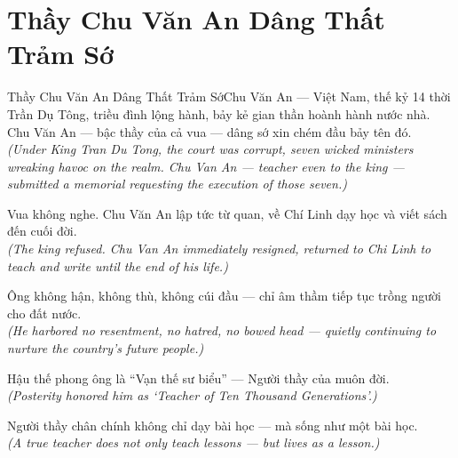 \section{Thầy Chu Văn An Dâng Thất Trảm Sớ}
\begin{truyen}{Thầy Chu Văn An Dâng Thất Trảm Sớ}{Chu Văn An --- Việt Nam, thế kỷ 14}
 thời Trần Dụ Tông, triều đình lộng hành, bảy kẻ gian thần hoành hành nước nhà. Chu Văn An --- bậc thầy của cả vua --- dâng sớ xin chém đầu bảy tên đó.\\[4pt]
\textit{(Under King Tran Du Tong, the court was corrupt, seven wicked ministers wreaking havoc on the realm. Chu Van An --- teacher even to the king --- submitted a memorial requesting the execution of those seven.)}

Vua không nghe. Chu Văn An lập tức từ quan, về Chí Linh dạy học và viết sách đến cuối đời.\\[4pt]
\textit{(The king refused. Chu Van An immediately resigned, returned to Chi Linh to teach and write until the end of his life.)}

Ông không hận, không thù, không cúi đầu --- chỉ âm thầm tiếp tục trồng người cho đất nước.\\[4pt]
\textit{(He harbored no resentment, no hatred, no bowed head --- quietly continuing to nurture the country's future people.)}

Hậu thế phong ông là ``Vạn thế sư biểu'' --- Người thầy của muôn đời.\\[4pt]
\textit{(Posterity honored him as `Teacher of Ten Thousand Generations'.)}

\end{truyen}
\begin{baihoc}
  Người thầy chân chính không chỉ dạy bài học --- mà sống như một bài học.\\[4pt]
  \textit{(A true teacher does not only teach lessons --- but lives as a lesson.)}
\end{baihoc}

